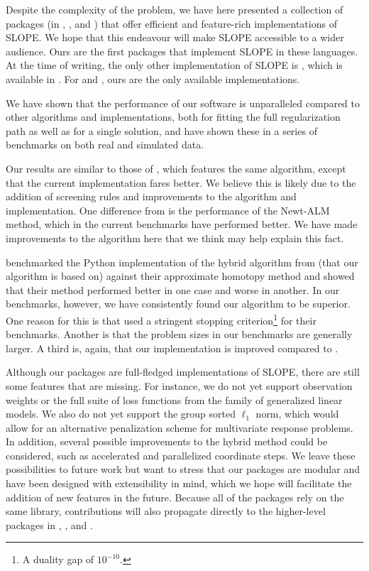\documentclass[article]{jss}
\begin{document}
Despite the complexity of the problem, we have here presented a collection of
packages (in , , and ) that offer
efficient and feature-rich implementations of SLOPE. We hope that this
endeavour will make SLOPE accessible to a wider audience. Ours are the first
packages that implement SLOPE in these languages. At the time of writing, the
only other implementation of SLOPE is , which is available in
. For  and , ours are the only
available implementations.

We have shown that the performance of our software is unparalleled compared to
other algorithms and implementations, both for fitting the full regularization
path as well as for a single solution, and have shown these in a series of
benchmarks on both real and simulated data.

Our results are similar to those of \citet{larsson2023}, which features the
same algorithm, except that the current implementation fares better. We
believe this is likely due to the addition of screening rules and improvements
to the algorithm and implementation. One difference from \citet{larsson2023} is
the performance of the Newt-ALM method, which in the current benchmarks have
performed better. We have made improvements to the algorithm here that we think may
help explain this fact.

\citet{dupuis2024} benchmarked the Python implementation of the hybrid
algorithm from \citet{larsson2023} (that our algorithm is based on) against
their approximate homotopy method and showed that their method performed better
in one case and worse in another. In our benchmarks, however, we have
consistently found our algorithm to be superior. One reason for this is that
\citet{dupuis2024} used a stringent stopping criterion\footnote{A duality
  gap of \(10^{-10}\).} for their benchmarks. Another is that the problem sizes in
our benchmarks are generally larger. A third is, again, that our implementation
is improved compared to \citet{larsson2023}.

Although our packages are full-fledged implementations of SLOPE, there are
still some features that are missing. For instance, we do not yet support
observation weights or the full suite of loss functions from the family of
generalized linear models. We also do not yet support the group sorted \(\ell_1\)
norm, which would allow for an alternative penalization scheme for multivariate
response problems. In addition, several possible improvements to the hybrid
method could be considered, such as accelerated and parallelized coordinate
steps. We leave these possibilities to future work but want to stress that our
packages are modular and have been designed with extensibility in mind, which
we hope will facilitate the addition of new features in the future. Because all
of the packages rely on the same  library, contributions will
also propagate directly to the higher-level packages in ,
, and .
\end{document}
